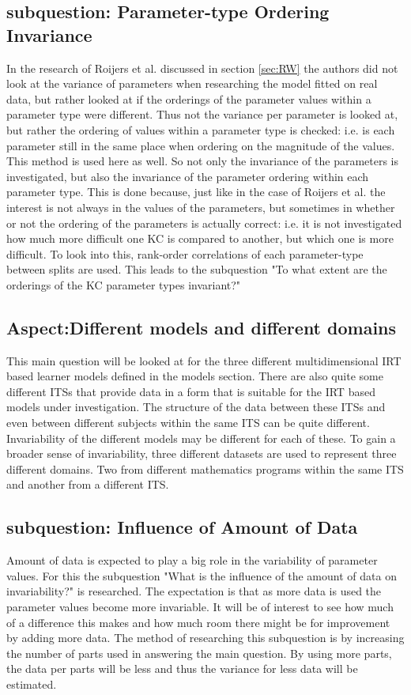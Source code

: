 \documentclass{scrartcl}
\begin{document}
\subsection{subquestion: Parameter-type Ordering Invariance}
In the research of Roijers et al. discussed in section \ref{sec:RW} the authors did not look at the variance of parameters when researching the model fitted on real data, but rather looked at if the orderings of the parameter values within a parameter type were different. Thus not the variance per parameter is looked at, but rather the ordering of values within a parameter type is checked: i.e. is each parameter still in the same place when ordering on the magnitude of the values. This method is used here as well. So not only the invariance of the parameters is investigated, but also the invariance of the parameter ordering within each parameter type. This is done because, just like in the case of Roijers et al. the interest is not always in the values of the parameters, but sometimes in whether or not the ordering of the parameters is actually correct: i.e. it is not investigated how much more difficult one KC is compared to another, but which one is more difficult. To look into this, rank-order correlations of each parameter-type between splits are used. This leads to the subquestion "To what extent are the orderings of the KC parameter types invariant?" 

\subsection{Aspect:Different models and different domains}
This main question will be looked at for the three different multidimensional IRT based learner models defined in the models section. There are also quite some different ITSs that provide data in a form that is suitable for the IRT based models under investigation. The structure of the data between these ITSs and even between different subjects within the same ITS can be quite different. Invariability of the different models may be different for each of these. To gain a broader sense of invariability, three different datasets are used to represent three different domains. Two from different mathematics programs within the same ITS and another from a different ITS.

\subsection{subquestion: Influence of Amount of Data}
Amount of data is expected to play a big role in the variability of parameter values. For this the subquestion "What is the influence of the amount of data on invariability?" is researched. The expectation is that as more data is used the parameter values become more invariable. It will be of interest to see how much of a difference this makes and how much room there might be for improvement by adding more data. The method of researching this subquestion is by increasing the number of parts used in answering the main question. By using more parts, the data per parts will be less and thus the variance for less data will be estimated.
\end{document}
